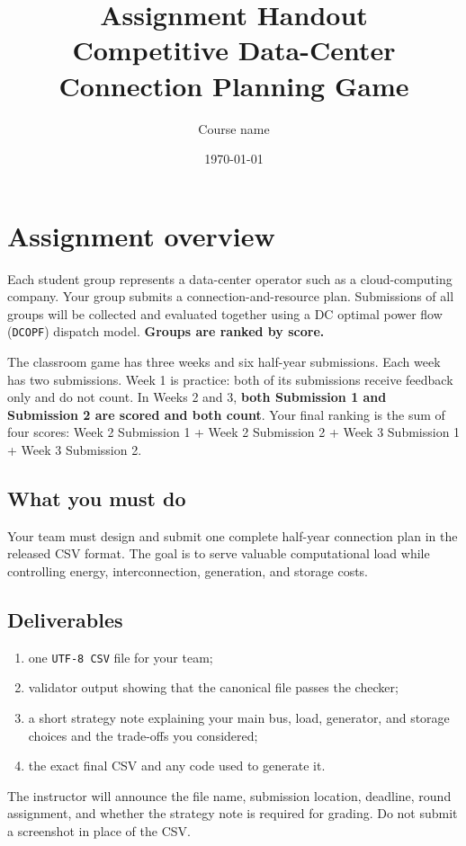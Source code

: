 \documentclass[12pt]{article}
\title{\textbf{Assignment Handout}\\[0.4em]
  \large Competitive Data-Center Connection Planning Game}
\author{Course name}
\date{\today}
\newcommand{\code}[1]{\texttt{#1}}
\begin{document}
\maketitle

\begin{center}
\end{center}

\tableofcontents
\newpage

\section{Assignment overview}

Each student group represents a data-center operator such as a cloud-computing
company. Your group submits a connection-and-resource plan. Submissions of
all groups will be collected and evaluated together using a DC optimal power
flow (\code{DCOPF}) dispatch model. \textbf{Groups are ranked by score.}

The classroom game has three weeks and six half-year submissions. Each week
has two submissions. Week 1 is practice: both of its submissions receive
feedback only and do not count. In Weeks 2 and 3, \textbf{both Submission 1 and
Submission 2 are scored and both count}. Your final ranking is the sum of four
scores: Week 2 Submission 1 + Week 2 Submission 2 + Week 3 Submission 1 +
Week 3 Submission 2.

\subsection{What you must do}
Your team must design and submit one complete half-year connection plan in the
released CSV format. The goal is to serve valuable computational load while
controlling energy, interconnection, generation, and storage costs.

\subsection{Deliverables}
\begin{enumerate}[leftmargin=*]
  \item one \code{UTF-8 CSV} file for your team;
  \item validator output showing that the canonical file passes the checker;
  \item a short strategy note explaining your main bus, load, generator, and
  storage choices and the trade-offs you considered;
  \item the exact final CSV and any code used to generate it.
\end{enumerate}
The instructor will announce the file name, submission location, deadline,
round assignment, and whether the strategy note is required for grading. Do
not submit a screenshot in place of the CSV.
\end{document}
